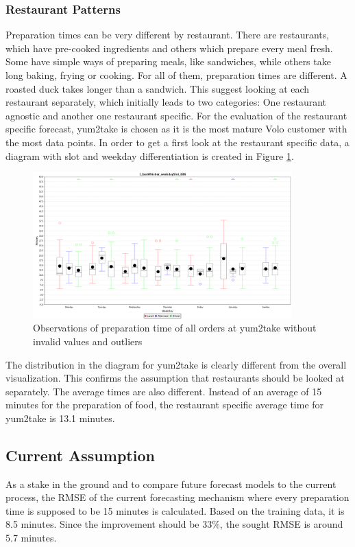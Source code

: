 \subsubsection{Restaurant Patterns}\label{subsection:Restaurant Wise Proceeding}
Preparation times can be very different by restaurant. There are restaurants, which have pre-cooked ingredients and others which prepare every meal fresh. Some have simple ways of preparing meals, like sandwiches, while others take long baking, frying or cooking. For all of them, preparation times are different. A roasted duck takes longer than a sandwich.\newline
This suggest looking at each restaurant separately, which initially leads to two categories: One restaurant agnostic and another one restaurant specific. For the evaluation of the restaurant specific forecast, yum2take is chosen as it is the most mature Volo customer with the most data points.\newline
In order to get a first look at the restaurant specific data, a diagram with slot and weekday differentiation is created in Figure \ref{fig:1_boxWhisker_weekdaySlot_686}.
\begin{figure}[h]
\begin{center}
\includegraphics[width=10cm]{images/1_boxWhisker_weekdaySlot_686.png}
\caption{Observations of preparation time of all orders at yum2take without invalid values and outliers}
\label{fig:1_boxWhisker_weekdaySlot_686}
\end{center}
\end{figure}
The distribution in the diagram for yum2take is clearly different from the overall visualization. This confirms the assumption that restaurants should be looked at separately. The average times are also different. Instead of an average of 15 minutes for the preparation of food, the restaurant specific average time for yum2take is 13.1 minutes.
\subsection{Current Assumption}
As a stake in the ground and to compare future forecast models to the current process, the RMSE of the current forecasting mechanism where every preparation time is supposed to be 15 minutes is calculated. Based on the training data, it is 8.5 minutes. Since the improvement should be 33\%, the sought RMSE is around 5.7 minutes.
